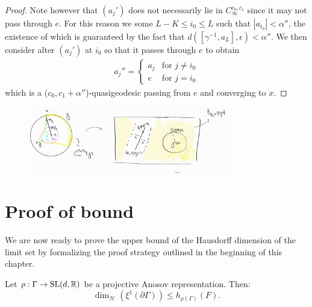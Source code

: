 \documentclass{report}
\begin{document}
\begin{proof}
    Note however that $(a_j')$ does not necessarily lie in $C_\infty^{c_0, c_1}$ since it may not pass through $e$.
    For this reason we some $L - K \leq i_0\leq L$ such that $|a_{i_0}| < \alpha''$, the existence of which is guaranteed by the fact that $d([\gamma^{-1}, a_L], \epsilon) < \alpha''$.
    We then consider alter $(a_j')$ at $i_0$ so that it passes through $e$ to obtain 
    \begin{align*}
        a_j''=
        \begin{cases}
            a_j & \text{for } j\neq i_0 \\
            e & \text{for } j = i_0
        \end{cases}      
    \end{align*}
    which is a ($c_0, c_1 + \alpha''$)-quasigeodesic passing from $e$ and converging to $x$.
\end{proof}
\begin{figure}[h]
    \centering
    \includegraphics[width=0.8\textwidth]{cone.jpg}
\end{figure}
\section{Proof of bound}
We are now ready to prove the upper bound of the Hausdorff dimension of the limit set by formalizing the proof strategy outlined in the beginning of this chapter.
\begin{lemma}\label{lem:upper_bound}
Let $\rho: \Gamma \to \operatorname{{\mathrm{SL}}}(d, \mathbb R)$ be a projective Anosov representation. 
Then:
\[
    \dim_{\mathcal H}(\xi^1 (\partial \Gamma) ) \leq h_{\rho(\Gamma)}(F).
\]
\end{lemma}
\end{document}
